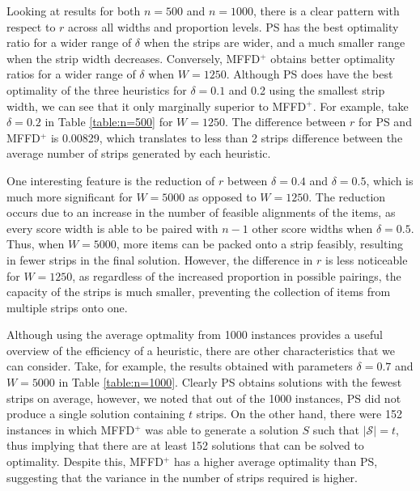 \documentclass[oribibl]{llncs}
\begin{document}
Looking at results for both $n = 500$ and $n = 1000$, there is a clear pattern with respect to $r$ across all widths and proportion levels. PS has the best optimality ratio for a wider range of $\delta$ when the strips are wider, and a much smaller range when the strip width decreases. Conversely, MFFD$^+$ obtains better optimality ratios for a wider range of $\delta$ when $W = 1250$. Although PS does have the best optimality of the three heuristics for $\delta = 0.1$ and 0.2 using the smallest strip width, we can see that it only marginally superior to MFFD$^+$. For example, take $\delta = 0.2$ in Table \ref{table:n=500} for $W = 1250$. The difference between $r$ for PS and MFFD$^+$ is 0.00829, which translates to less than 2 strips difference between the average number of strips generated by each heuristic.

One interesting feature is the reduction of $r$ between $\delta = 0.4$ and $\delta = 0.5$, which is much more significant for $W = 5000$ as opposed to $W = 1250$. The reduction occurs due to an increase in the number of feasible alignments of the items, as every score width is able to be paired with $n-1$ other score widths when $\delta = 0.5$. Thus, when $W = 5000$, more items can be packed onto a strip feasibly, resulting in fewer strips in the final solution. However, the difference in $r$ is less noticeable for $W = 1250$, as regardless of the increased proportion in possible pairings, the capacity of the strips is much smaller, preventing the collection of items from multiple strips onto one.

Although using the average optmality from 1000 instances provides a useful overview of the efficiency of a heuristic, there are other characteristics that we can consider. Take, for example, the results obtained with parameters $\delta = 0.7$ and $W = 5000$ in Table \ref{table:n=1000}. Clearly PS obtains solutions with the fewest strips on average, however, we noted that out of the 1000 instances, PS did not produce a single solution containing $t$ strips. On the other hand, there were 152 instances in which MFFD$^+$ was able to generate a solution $S$ such that $|\mathcal{S}| = t$, thus implying that there are at least 152 solutions that can be solved to optimality. Despite this, MFFD$^+$ has a higher average optimality than PS, suggesting that the variance in the number of strips required is higher.
\end{document}
